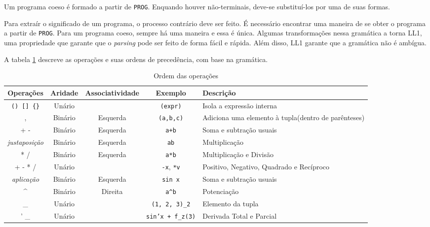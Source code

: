 Um programa coeso é formado a partir de \texttt{PROG}.
Enquando houver não-terminais, deve-se substituí-los por uma de suas formas.

Para extraír o significado de um programa, o processo contrário deve ser feito. 
É necessário encontrar uma maneira de se obter o programa a partir de \texttt{PROG}.
Para um programa coeso, sempre há uma maneira e essa é única.
Algumas transformações nessa gramática a torna LL1,
uma propriedade que garante que o \textit{parsing} pode ser feito de forma fácil e rápida.
Além disso, LL1 garante que a gramática não é ambígua. \cite{GramCheck}

A tabela \ref{order} descreve as operações e suas ordens de precedência, com base na gramática.

\begin{table}[ht]
\caption{Ordem das operações}
\label{order}
\begin{centering}
\begin{tabularx}{\textwidth}{||c|c|c|c|X||}
    \cline{1-5}
    Operações & Aridade & Associatividade & Exemplo & Descrição \\ \hline \hline

    \texttt{() [] \{\}} & Unário &  & \texttt{(expr)} & Isola a expressão interna \\ \hline
    , & Binário & Esquerda & \texttt{(a,b,c)} & Adiciona uma elemento à tupla(dentro de parênteses) \\ \hline
    + - & Binário & Esquerda & \texttt{a+b} & Soma e subtração usuais \\ \hline
    \textit{justaposição} & Binário & Esquerda & \texttt{ab} & Multiplicação \\ \hline
    * / & Binário & Esquerda & \texttt{a*b} & Multiplicação e Divisão \\ \hline
    + - * / & Unário &  & \texttt{-x}, \texttt{*v} & Positivo, Negativo, Quadrado e Recíproco \\ \hline
    \textit{aplicação} & Binário & Esquerda & \texttt{sin x} & Soma e subtração usuais \\ \hline
    \textasciicircum & Binário & Direita & \texttt{a\textasciicircum b} & Potenciação \\ \hline
    \_ & Unário & & \texttt{(1, 2, 3)\_2} & Elemento da tupla \\ \hline
    ' \_ & Unário & & \texttt{sin'x + f\_z(3)} & Derivada Total e Parcial \\ \hline
    \cline{1-5}
\end{tabularx}
\end{centering}
\end{table}


